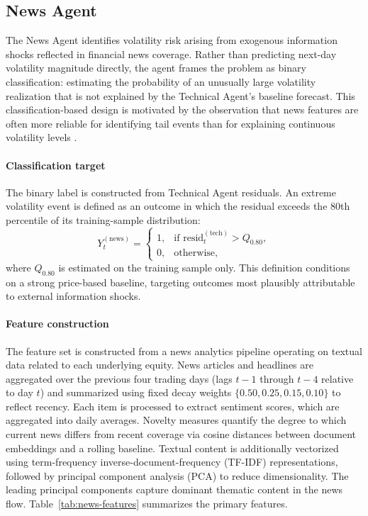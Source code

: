\documentclass[review]{elsarticle}
\begin{document}
\subsection{News Agent}\label{news-agent}

The News Agent identifies volatility risk arising from exogenous information shocks reflected in financial news coverage. Rather than predicting next-day volatility magnitude directly, the agent frames the problem as binary classification: estimating the probability of an unusually large volatility realization that is not explained by the Technical Agent's baseline forecast. This classification-based design is motivated by the observation that news features are often more reliable for identifying tail events than for explaining continuous volatility levels \cite{engelberg2011}.

\paragraph{Classification target}
The binary label is constructed from Technical Agent residuals. An extreme volatility event is defined as an outcome in which the residual exceeds the 80th percentile of its training-sample distribution:
\begin{equation}\label{eq:news-target}
Y_{t}^{(\text{news})} =
\begin{cases}
1, & \text{if } \text{resid}_{t}^{(\text{tech})} > Q_{0.80}, \\
0, & \text{otherwise},
\end{cases}
\end{equation}
where $Q_{0.80}$ is estimated on the training sample only. This definition conditions on a strong price-based baseline, targeting outcomes most plausibly attributable to external information shocks.

\paragraph{Feature construction}
The feature set is constructed from a news analytics pipeline operating on textual data related to each underlying equity. News articles and headlines are aggregated over the previous four trading days (lags $t{-}1$ through $t{-}4$ relative to day $t$) and summarized using fixed decay weights $\{0.50, 0.25, 0.15, 0.10\}$ to reflect recency. %
Each item is processed to extract sentiment scores, which are aggregated into daily averages. Novelty measures quantify the degree to which current news differs from recent coverage via cosine distances between document embeddings and a rolling baseline. Textual content is additionally vectorized using term-frequency inverse-document-frequency (TF-IDF) representations, followed by principal component analysis (PCA) to reduce dimensionality. The leading principal components capture dominant thematic content in the news flow. Table~\ref{tab:news-features} summarizes the primary features.
\end{document}
